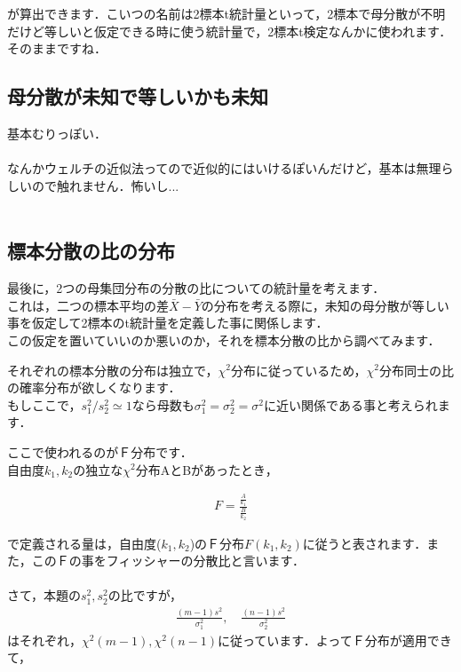 \documentclass[11pt,a4paper]{ujreport} 	%
\begin{document}
が算出できます．こいつの名前は2標本t統計量といって，2標本で母分散が不明だけど等しいと仮定できる時に使う統計量で，2標本t検定なんかに使われます．そのままですね．





\subsection{母分散が未知で等しいかも未知}
基本むりっぽい．\\
\\

なんかウェルチの近似法ってので近似的にはいけるぽいんだけど，基本は無理らしいので触れません．怖いし...\\\\

\subsection{標本分散の比の分布}
最後に，2つの母集団分布の分散の比についての統計量を考えます．\\

これは，二つの標本平均の差$\bar{X}-\bar{Y}$の分布を考える際に，未知の母分散が等しい事を仮定して2標本のt統計量を定義した事に関係します．\\

この仮定を置いていいのか悪いのか，それを標本分散の比から調べてみます．


それぞれの標本分散の分布は独立で，$\chi^2$分布に従っているため，$\chi^2$分布同士の比の確率分布が欲しくなります．\\

もしここで，$s_1^2/s_2^2≃1$なら母数も$\sigma_1^2 = \sigma_2^2=\sigma^2$に近い関係である事と考えられます．

ここで使われるのがＦ分布です．\\

自由度$k_1, k_2$の独立な$\chi^2$分布AとBがあったとき，

\begin{align}
  F = \frac{\frac{A}{k_1}}{\frac{B}{k_2}}
\end{align}

で定義される量は，自由度($k_1,k_2$)のＦ分布$F(k_1,k_2)$に従うと表されます．また，このＦの事をフィッシャーの分散比と言います．\\
\\

さて，本題の$s_1^2, s_2^2$の比ですが，
\begin{align}
  \frac{(m-1)s^2}{\sigma_1^2}, \quad \frac{(n-1)s^2}{\sigma_2^2}
\end{align}
はそれぞれ，$\chi^2(m-1), \chi^2(n-1)$に従っています．よってＦ分布が適用できて，
\end{document}

